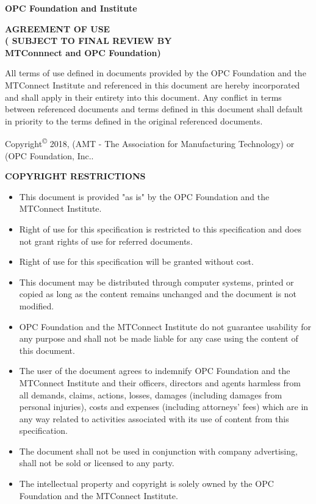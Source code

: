 \textbf{\Large {OPC Foundation and \mtconnect Institute}}

\begin{center}
    \textbf{AGREEMENT OF USE \\ 
    ({\color{red} SUBJECT TO FINAL REVIEW BY \\ 
    MTConnnect and OPC Foundation})}
\end{center}

All terms of use defined in documents provided by the OPC Foundation and the MTConnect Institute and referenced in this document are hereby incorporated and shall apply in their entirety into this document.   Any conflict in terms between referenced documents and terms defined in this document shall default in priority to the terms defined in the original referenced documents.

Copyright\textsuperscript{\copyright} 2018, {\color{red} (AMT - The Association for Manufacturing Technology) or (OPC Foundation, Inc.}.

\textbf{COPYRIGHT RESTRICTIONS}

\begin{itemize}
    \item This document is provided "as is" by the OPC Foundation and the MTConnect Institute.
    \item Right of use for this specification is restricted to this specification and does not grant rights of use for referred documents.
    \item Right of use for this specification will be granted without cost.
    \item This document may be distributed through computer systems, printed or copied as long as the content remains unchanged and the document is not modified.
    \item OPC Foundation and the MTConnect Institute do not guarantee usability for any purpose and shall not be made liable for any case using the content of this document.
    \item The user of the document agrees to indemnify OPC Foundation and the MTConnect Institute and their officers, directors and agents harmless from all demands, claims, actions, losses, damages (including damages from personal injuries), costs and expenses (including attorneys' fees) which are in any way related to activities associated with its use of content from this specification.
    \item The document shall not be used in conjunction with company advertising, shall not be sold or licensed to any party.
    
    \item The intellectual property and copyright is solely owned by the OPC Foundation and the MTConnect Institute.
\end{itemize}

